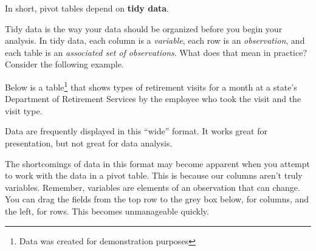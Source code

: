 \documentclass[]{book}
\newenvironment{Shaded}{\begin{snugshade}}{\end{snugshade}}
\newcommand{\CommentTok}[1]{\textcolor[rgb]{0.56,0.35,0.01}{\textit{#1}}}
\newcommand{\DataTypeTok}[1]{\textcolor[rgb]{0.13,0.29,0.53}{#1}}
\newcommand{\DecValTok}[1]{\textcolor[rgb]{0.00,0.00,0.81}{#1}}
\newcommand{\KeywordTok}[1]{\textcolor[rgb]{0.13,0.29,0.53}{\textbf{#1}}}
\newcommand{\NormalTok}[1]{#1}
\newcommand{\OperatorTok}[1]{\textcolor[rgb]{0.81,0.36,0.00}{\textbf{#1}}}
\newcommand{\OtherTok}[1]{\textcolor[rgb]{0.56,0.35,0.01}{#1}}
\newcommand{\StringTok}[1]{\textcolor[rgb]{0.31,0.60,0.02}{#1}}
\begin{document}
In short, pivot tables depend on \textbf{tidy data}.

Tidy data is the way your data should be organized before you begin your analysis. In tidy data, each column is a \emph{variable}, each row is an \emph{observation}, and each table is an \emph{associated set of observations}. What does that mean in practice? Consider the following example.

Below is a table\footnote{Data was created for demonstration purposes} that shows types of retirement visits for a month at a state's Department of Retirement Services by the employee who took the visit and the visit type.

\begin{Shaded}
\end{Shaded}

\hypertarget{htmlwidget-7398777c45f3825902c2}{}

Data are frequently displayed in this ``wide'' format. It works great for presentation, but not great for data analysis.

The shortcomings of data in this format may become apparent when you attempt to work with the data in a pivot table. This is because our columns aren't truly variables. Remember, variables are elements of an observation that can change. You can drag the fields from the top row to the grey box below, for columns, and the left, for rows. This becomes unmanageable quickly.
\end{document}
